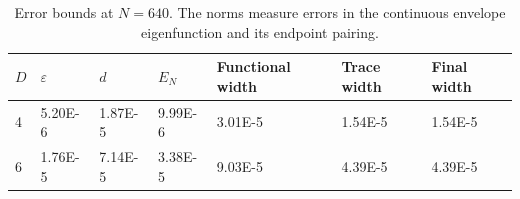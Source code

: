 \begin{table}[htbp]
\centering
\caption{Error bounds at $N=640$. The norms measure errors in the continuous envelope eigenfunction and its endpoint pairing.}
\label{tab:boundary_budget}
\begin{tabular}{lllllll}
\toprule
$D$ & $\varepsilon$ & $d$ & $E_N$ & Functional width & Trace width & Final width \\
\midrule
4 & 5.20E-6 & 1.87E-5 & 9.99E-6 & 3.01E-5 & 1.54E-5 & 1.54E-5 \\
6 & 1.76E-5 & 7.14E-5 & 3.38E-5 & 9.03E-5 & 4.39E-5 & 4.39E-5 \\
\bottomrule
\end{tabular}
\end{table}

